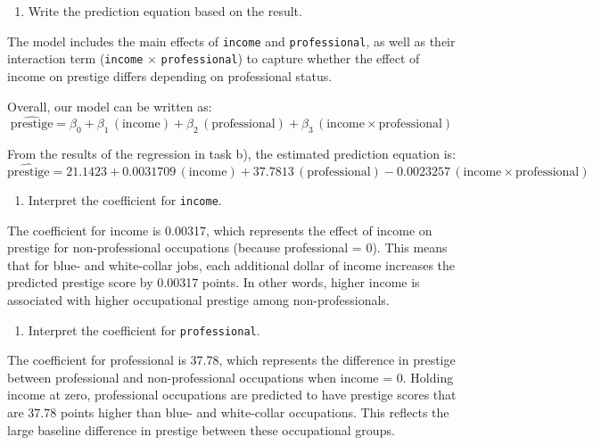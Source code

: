 \documentclass[
]{article}
\begin{document}
\newpage

\begin{enumerate}
	\item [(c)]
Write the prediction equation based on the result.
\end{enumerate}

The model includes the main effects of \texttt{income} and \texttt{professional}, as well as their interaction term (\texttt{income} $\times$ \texttt{professional}) to capture whether the effect of income on prestige differs depending on professional status.

Overall, our model can be written as:
\[
\widehat{\text{prestige}} = \beta_0 + \beta_1\,(\text{income}) + \beta_2\,(\text{professional}) + \beta_3\,(\text{income} \times \text{professional})
\]

From the results of the regression in task b), the estimated prediction equation is:
\[
\widehat{\text{prestige}} = 21.1423 + 0.0031709\,(\text{income}) + 37.7813\,(\text{professional}) - 0.0023257\,(\text{income} \times \text{professional})
\]


\vspace{.0cm}

\begin{enumerate}
	\item [(d)]
Interpret the coefficient for \texttt{income}.
\end{enumerate}
The coefficient for income is 0.00317, which represents the
effect of income on prestige for non-professional occupations (because
professional = 0). This means that for blue- and white-collar jobs, each
additional dollar of income increases the predicted prestige score by
0.00317 points. In other words, higher income is associated with higher
occupational prestige among non-professionals.

\vspace{.35cm}
	
\begin{enumerate}
	
	\item [(e)]
Interpret the coefficient for \texttt{professional}.
\end{enumerate}

The coefficient for professional is 37.78, which represents the
difference in prestige between professional and non-professional
occupations when income = 0. Holding income at zero, professional
occupations are predicted to have prestige scores that are 37.78 points
higher than blue- and white-collar occupations. This reflects the large
baseline difference in prestige between these occupational groups.
\end{document}
